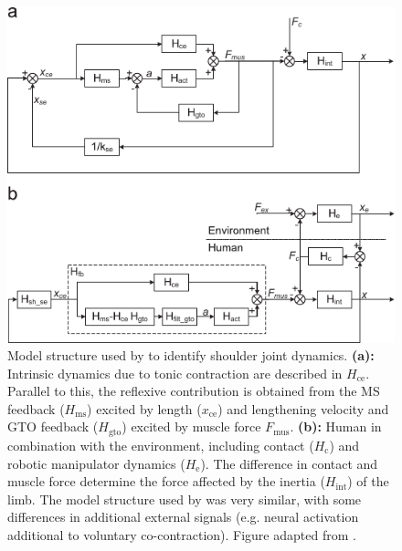 \begin{figure}[t]
    \centering
    \includegraphics[width=.8\linewidth]{Figures/models_assumptions/model_schouten_2008.pdf}
    \caption{Model structure used by \citeauthor{schouten_nmclab_2008} to identify shoulder joint dynamics. \textbf{(a):} Intrinsic dynamics due to tonic contraction are described in $H_\text{ce}$. Parallel to this, the reflexive contribution is obtained from the MS feedback ($H_\text{ms}$) excited by length ($x_\text{ce}$) and lengthening velocity and GTO feedback ($H_\text{gto}$) excited by muscle force $F_\text{mus}$. \textbf{(b):} Human in combination with the environment, including contact ($H_\text{c}$) and robotic manipulator dynamics ($H_\text{e}$). The difference in contact and muscle force determine the force affected by the inertia ($H_\text{int}$) of the limb. The model structure used by \citet{mugge_rigorous_2010} was very similar, with some differences in additional external signals (e.g. neural activation additional to voluntary co-contraction). Figure adapted from \citet{schouten_nmclab_2008}. }
  \label{fig:model_schouten_2008}
\end{figure}


